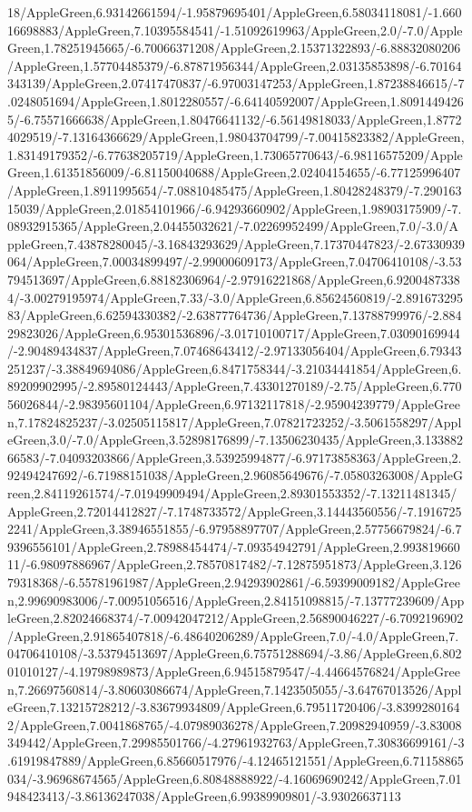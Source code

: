 {\begin{tikzternal}
18/AppleGreen,6.93142661594/-1.95879695401/AppleGreen,6.58034118081/-1.66016698883/AppleGreen,7.10395584541/-1.51092619963/AppleGreen,2.0/-7.0/AppleGreen,1.78251945665/-6.70066371208/AppleGreen,2.15371322893/-6.88832080206/AppleGreen,1.57704485379/-6.87871956344/AppleGreen,2.03135853898/-6.70164343139/AppleGreen,2.07417470837/-6.97003147253/AppleGreen,1.87238846615/-7.0248051694/AppleGreen,1.8012280557/-6.64140592007/AppleGreen,1.80914494265/-6.75571666638/AppleGreen,1.80476641132/-6.56149818033/AppleGreen,1.87724029519/-7.13164366629/AppleGreen,1.98043704799/-7.00415823382/AppleGreen,1.83149179352/-6.77638205719/AppleGreen,1.73065770643/-6.98116575209/AppleGreen,1.61351856009/-6.81150040688/AppleGreen,2.02404154655/-6.77125996407/AppleGreen,1.8911995654/-7.08810485475/AppleGreen,1.80428248379/-7.29016315039/AppleGreen,2.01854101966/-6.94293660902/AppleGreen,1.98903175909/-7.08932915365/AppleGreen,2.04455032621/-7.02269952499/AppleGreen,7.0/-3.0/AppleGreen,7.43878280045/-3.16843293629/AppleGreen,7.17370447823/-2.67330939064/AppleGreen,7.00034899497/-2.99000609173/AppleGreen,7.04706410108/-3.53794513697/AppleGreen,6.88182306964/-2.97916221868/AppleGreen,6.92004873384/-3.00279195974/AppleGreen,7.33/-3.0/AppleGreen,6.85624560819/-2.89167329583/AppleGreen,6.62594330382/-2.63877764736/AppleGreen,7.13788799976/-2.88429823026/AppleGreen,6.95301536896/-3.01710100717/AppleGreen,7.03090169944/-2.90489434837/AppleGreen,7.07468643412/-2.97133056404/AppleGreen,6.79343251237/-3.38849694086/AppleGreen,6.8471758344/-3.21034441854/AppleGreen,6.89209902995/-2.89580124443/AppleGreen,7.43301270189/-2.75/AppleGreen,6.77056026844/-2.98395601104/AppleGreen,6.97132117818/-2.95904239779/AppleGreen,7.17824825237/-3.02505115817/AppleGreen,7.07821723252/-3.5061558297/AppleGreen,3.0/-7.0/AppleGreen,3.52898176899/-7.13506230435/AppleGreen,3.13388266583/-7.04093203866/AppleGreen,3.53925994877/-6.97173858363/AppleGreen,2.92494247692/-6.71988151038/AppleGreen,2.96085649676/-7.05803263008/AppleGreen,2.84119261574/-7.01949909494/AppleGreen,2.89301553352/-7.13211481345/AppleGreen,2.72014412827/-7.1748733572/AppleGreen,3.14443560556/-7.19167252241/AppleGreen,3.38946551855/-6.97958897707/AppleGreen,2.57756679824/-6.79396556101/AppleGreen,2.78988454474/-7.09354942791/AppleGreen,2.99381966011/-6.98097886967/AppleGreen,2.78570817482/-7.12875951873/AppleGreen,3.12679318368/-6.55781961987/AppleGreen,2.94293902861/-6.59399009182/AppleGreen,2.99690983006/-7.00951056516/AppleGreen,2.84151098815/-7.13777239609/AppleGreen,2.82024668374/-7.00942047212/AppleGreen,2.56890046227/-6.7092196902/AppleGreen,2.91865407818/-6.48640206289/AppleGreen,7.0/-4.0/AppleGreen,7.04706410108/-3.53794513697/AppleGreen,6.75751288694/-3.86/AppleGreen,6.80201010127/-4.19798989873/AppleGreen,6.94515879547/-4.44664576824/AppleGreen,7.26697560814/-3.80603086674/AppleGreen,7.1423505055/-3.64767013526/AppleGreen,7.13215728212/-3.83679934809/AppleGreen,6.79511720406/-3.83992801642/AppleGreen,7.0041868765/-4.07989036278/AppleGreen,7.20982940959/-3.83008349442/AppleGreen,7.29985501766/-4.27961932763/AppleGreen,7.30836699161/-3.61919847889/AppleGreen,6.85660517976/-4.12465121551/AppleGreen,6.71158865034/-3.96968674565/AppleGreen,6.80848888922/-4.16069690242/AppleGreen,7.01948423413/-3.86136247038/AppleGreen,6.99389909801/-3.93026637113
\end{tikzternal}}
